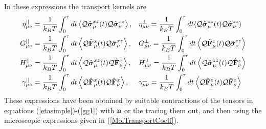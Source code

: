 \documentclass[b5paper,openright,10pt]{book}
\begin{document}
In these expressions the transport kernels are
\begin{align}
\eta^{||}_{\mu\nu}&
=\frac{1}{k_BT}\int_0^\tau  dt\left\langle 
{\cal Q}\hat{\boldsymbol{\sigma}}^{xz}_\mu(t){\cal Q}\hat{\boldsymbol{\sigma}}^{xz}_\nu
\right\rangle,&&
\eta^{\bot}_{\mu\nu}
= \frac{1}{k_BT}\int_0^\tau  dt\langle 
{\cal Q}\hat{\boldsymbol{\sigma}}^{zz}_\mu(t)
{\cal Q}\hat{\boldsymbol{\sigma}}^{zz}_\nu\rangle
\nonumber\\
G^{||}_{\mu\nu}&
=\frac{1}{k_BT} \int_0^\tau  dt
\left\langle{\cal Q}\hat{\bf F}^{x}_\mu(t)
{\cal Q}\hat{\boldsymbol{\sigma}}^{xz}_\nu
\right\rangle,&&
G^{\bot}_{\mu\nu}=\frac{1}{k_BT} \int_0^\tau  dt
\left\langle {\cal Q}\hat{\bf F}^{z}_\mu(t)
{\cal Q}\hat{\boldsymbol{\sigma}}^{zz}_\nu
\right\rangle
\nonumber\\
H^{||}_{\mu\nu}&
=\frac{1}{k_BT} 
\int_0^\tau  dt
\left\langle{\cal Q}\hat{\boldsymbol{\sigma}}^{xz}_\mu(t){\cal Q}\hat{\bf F}^{x}_\nu\right\rangle, &&
H^\bot_{\mu\nu}=\frac{1}{k_BT} 
\int_0^\tau  dt\left\langle {\cal Q}\hat{\boldsymbol{\sigma}}^{zz}_\mu(t){\cal Q}\hat{\bf F}^{z}_\nu\right\rangle
\nonumber\\
\gamma^{||}_{\mu\nu}&=
\frac{1}{k_BT} \int_0^\tau  dt
\left\langle 
{\cal Q}\hat{\bf F}^{x}_\mu(t)
{\cal Q}\hat{\bf F}^{x}_\nu\right\rangle,&&
\gamma^{\bot}_{\mu\nu}=
\frac{1}{k_BT} \int_0^\tau  dt\left\langle 
{\cal Q}\hat{\bf F}^{z}_\mu(t){\cal Q}\hat{\bf F}^{z}_\nu
\right\rangle
\label{summary_munu}
\end{align}
These expressions have  been obtained by suitable  contractions of the
tensors  in equations  (\ref{etasimple})-(\ref{gg1})  with ${\bf  n}$ or  the
tracing them out, and then  using the microscopic expressions given in
(\ref{MolTransportCoeff}).
\end{document}
